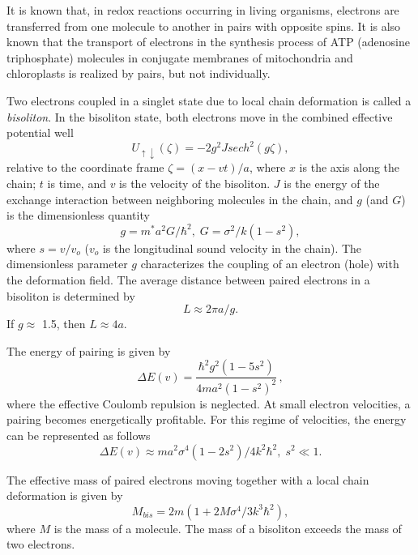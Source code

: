 It is known that, in redox reactions occurring in living organisms, 
electrons are transferred from one molecule to another in pairs with 
opposite spins. It is also known that the transport of electrons in the 
synthesis process of ATP (adenosine triphosphate) molecules in conjugate 
membranes of mitochondria and chloroplasts is realized by pairs, but not 
individually. 

Two electrons coupled in a singlet state due to local chain deformation is
called a {\em bisoliton}. In the bisoliton state, both electrons move in the 
combined effective potential well
\begin{equation}
U_{\uparrow\downarrow}(\zeta) = -2g^{2}Jsech^{2}(g\zeta),
\end{equation}
relative to the coordinate frame $\zeta = (x-vt)/a$, where $x$ is the 
axis along the chain; $t$ is time, and $v$ is the velocity of the bisoliton. 
$J$ is the energy of the exchange interaction between neighboring 
molecules in the chain, and $g$ (and $G$) is the dimensionless quantity
\begin{equation}
g = m^{\ast}a^{2}G/\hbar^{2}, \; G = \sigma^{2}/k(1-s^{2}),
\end{equation}
where $s = v/v_{o}$ ($v_{o}$ is the longitudinal sound velocity in the
chain). The dimensionless parameter $g$ characterizes the coupling of an 
electron (hole) with the deformation field. The average distance between 
paired electrons in a bisoliton is determined by
\begin{equation}
L \approx 2\pi a /g.
\end{equation}
If $g \approx$ 1.5, then $L \approx 4a$.

The energy of pairing is given by
\begin{equation}
\Delta E(v) = \frac{\hbar^{2}g^{2}(1-5s^{2})}{4ma^{2}(1-s^{2})^{2}}\, ,
\end{equation}
where the effective Coulomb repulsion is neglected. 
At small electron velocities, a pairing becomes energetically profitable.
For this regime of velocities, the energy can be represented as follows
\begin{equation}
\Delta E(v) \approx ma^{2}\sigma^{4}(1-2s^{2})/4k^{2}\hbar^{2}, \; s^{2}\ll 1.
\end{equation}

The effective mass of paired electrons moving together with a local chain
deformation is given by
\begin{equation}
M_{bis} = 2m(1+2M\sigma^{4}/3k^{3}\hbar^{2}),
\end{equation}
where $M$ is the mass of a molecule. The mass of a bisoliton exceeds the
mass of two electrons.

